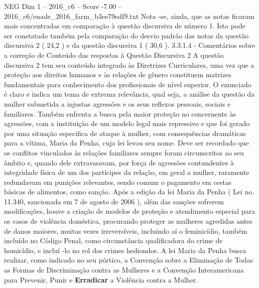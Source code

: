 \begin{textsample}{NEG Dim 1 – 2016\_c6 – Score -7.00 – 2016\_c6/enade\_2016\_farm\_b3ee79edf9.txt}
Nota -se, ainda, que as notas ficaram mais concentradas em comparação à questão discursiva de número 1.
Isto pode ser constatado também pela comparação do desvio padrão das notas da questão discursiva 2 ( 24,2 ) e da questão discursiva 1 ( 30,6 ). 3.3.1.4 - Comentários sobre a correção de Conteúdo das respostas à Questão Discursiva 2 A questão discursiva 2 tem seu conteúdo integrado às Diretrizes Curriculares, uma vez que a proteção aos direitos humanos e às relações de gênero constituem matrizes fundamentais para conhecimento dos profissionais de nível superior.
O enunciado é claro e indica um tema de extrema relevância, qual seja, a análise da questão da mulher submetida a injustas agressões e os seus reflexos pessoais, sociais e familiares.
Também enfrenta a busca pela maior proteção no concernente às agressões, com a instituição de um modelo legal mais repressivo e que foi gerado por uma situação especifica de ataque à mulher, com consequências dramáticas para a vítima, Maria da Penha, cuja lei levou seu nome.
Deve ser recordado que os conflitos vinculados às relações familiares sempre foram circunscritos ao seu âmbito e, quando dele extravasavam, por força de agressões contundentes à integridade física de um dos partícipes da relação, em geral a mulher, raramente redundavam em punições relevantes, sendo comum o pagamento em cestas básicas de alimentos, como sanção.
Após a edição da lei Maria da Penha ( Lei no. 11.340, sancionada em 7 de agosto de 2006 ), além das sanções sofrerem modificações, houve a criação de modelos de proteção e atendimento especial para os casos de violência doméstica, procurando proteger as mulheres agredidas antes de danos maiores, muitas vezes irreversíveis, incluindo aí o feminicídio, também incluído no Código Penal, como circunstância qualificadora do crime de homicídio, e incluí -lo no rol dos crimes hediondos.
A lei Maria da Penha busca realizar, como indicado no seu pórtico, a Convenção sobre a Eliminação de Todas as Formas de Discriminação contra as Mulheres e a Convenção Interamericana para Prevenir, Punir e \textbf{Erradicar} a Violência contra a Mulher.

\end{textsample}

